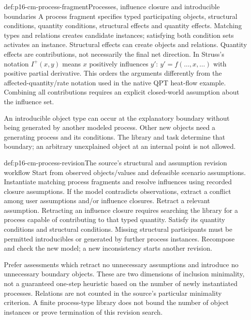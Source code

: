\begin{hbdefinition}{def:p16-cm-process-fragment}{Processes, influence closure and introducible boundaries}
A process fragment specifies typed participating objects, structural conditions,
quantity conditions, structural effects and quantity effects. Matching types
and relations creates candidate instances; satisfying both condition sets
activates an instance. Structural effects can create objects and relations.
Quantity effects are contributions, not necessarily the final net direction.
In Struss's notation \(I^+(x,y)\) means \(x\) positively influences
\(y'\): \(y'=f(\ldots,x,\ldots)\) with positive partial derivative.
This orders the arguments differently from the affected-quantity/rate notation
used in the native QPT heat-flow example. Combining all contributions requires
an explicit closed-world assumption about the influence set.

An introducible object type can occur at the explanatory boundary without
being generated by another modeled process. Other new objects need a
generating process and its conditions. The library and task determine that
boundary; an arbitrary unexplained object at an internal point is not allowed.
\end{hbdefinition}

\begin{hbmethod}{def:p16-cm-process-revision}{The source's structural and assumption revision workflow}
Start from observed objects/values and defeasible scenario assumptions.
Instantiate matching process fragments and resolve influences using recorded
closure assumptions. If the model contradicts observations, extract a
conflict among user assumptions and/or influence closures. Retract a relevant
assumption. Retracting an influence closure requires searching the library
for a process capable of contributing to that typed quantity. Satisfy its
quantity conditions and structural conditions. Missing structural participants
must be permitted introducibles or generated by further process instances.
Recompose and check the new model; a new inconsistency starts another revision.

Prefer assessments which retract no unnecessary assumptions and introduce
no unnecessary boundary objects. These are two dimensions of inclusion
minimality, not a guaranteed one-step heuristic based on the number of
newly instantiated processes. Relations are not counted in the source's
particular minimality criterion. A finite process-type library does not bound
the number of object instances or prove termination of this revision search.
\end{hbmethod}

